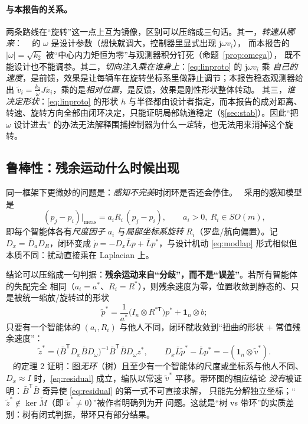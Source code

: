 \documentclass[11pt,a4paper]{ctexart}
\theoremstyle{plain}
\theoremstyle{definition}
\theoremstyle{remark}
\newcommand{\txi}{\tilde{x}}
\newcommand{\tv}{\tilde{v}}
\newcommand{\abs}[1]{\left|#1\right|}
\begin{document}
\paragraph{与本报告的关系。}
两条路线在“旋转”这一点上互为镜像，区别可以压缩成三句话。其一，\emph{转速从哪来}：
~\cite{lin2010} 的 $\omega$ 是设计参数（想快就调大，控制器里显式出现 $\mathrm j\omega v_i$），
而本报告的 $\abs{\omega}=\sqrt{k_2}$ 被“中心内力矩恒为零”与观测器积分钉死（命题~\ref{prop:omega}），
既不能设计也不能调参。其二，\emph{切向注入乘在谁身上}：\eqref{eq:linproto} 的 $\mathrm j\omega v_i$ 乘
\emph{自己的速度}，是前馈，效果是让每辆车在旋转坐标系里做静止调节；本报告稳态观测器给出
$\tv_i=\frac{k_2}{\omega}J\txi_i$，乘的是\emph{相对位置}，是反馈，效果是刚性形状整体转动。
其三，\emph{谁决定形状}：\eqref{eq:linproto} 的形状 $h$ 与半径都由设计者指定，而本报告的成对距离、
转速、旋转方向全部由闭环决定，只能证明局部轨道稳定（\S\ref{sec:stab}）。因此“把 $\omega$ 设计进去”
的办法无法解释围捕控制器为什么\emph{一定}转，也无法用来消掉这个旋转。

\subsection{鲁棒性：残余运动什么时候出现}
\label{sec:meth_robust}

同一框架下更微妙的问题是：\emph{感知不完美}时闭环是否还会停住。~\cite{tac2021} 采用的感知模型是
\begin{equation}
  (p_j-p_i)\big|_{\text{meas}}=a_iR_i\,(p_j-p_i),\qquad a_i>0,\ R_i\in SO(m),
  \label{eq:badsense}
\end{equation}
即每个智能体各有\emph{尺度因子} $a_i$ 与\emph{局部坐标系旋转} $R_i$（罗盘/航向偏置）。记
$D_x=\bar D_aD_R$，闭环变成 $\dot p=-D_x\bar Lp+\bar Lp^*$，与设计机动 \eqref{eq:modlap}
形式相似但本质不同：扰动直接乘在 Laplacian 上。

结论可以压缩成一句判据：\textbf{残余运动来自“分歧”，而不是“误差”}。若所有智能体的失配完全
相同（$a_i=a^*$、$R_i=R^*$），则残余速度为零，位置收敛到静态的、只是被统一缩放/旋转过的形状
\begin{equation}
  \tilde p^*=\frac{1}{a^*}\bigl(I_n\otimes R^{*\mathsf T}\bigr)p^*+\mathbf 1_n\otimes b ;
  \label{eq:trivial}
\end{equation}
只要有一个智能体的 $(a_i,R_i)$ 与他人不同，闭环就收敛到“扭曲的形状 + 常值残余速度”：
\begin{equation}
  \tilde z^*=\bigl(\bar B^{\mathsf T}D_x\bar B D_\omega\bigr)^{-1}\bar B^{\mathsf T}\bar BD_\omega z^*,
  \qquad
  D_x\bar L\tilde p^*-\bar Lp^*=-(\mathbf 1_n\otimes\tilde v^*).
  \label{eq:residual}
\end{equation}
~\cite{tac2021} 的定理 2 证明：图\emph{无环}（树）且至少有一个智能体的尺度或坐标系与他人不同、
$D_x\approx I$ 时，\eqref{eq:residual} 成立，编队以常速 $\tilde v^*$ 平移。带环图的相应结论
\emph{没有}被证明：$\bar B^{\mathsf T}\bar B$ 奇异使 \eqref{eq:residual} 的第一式不可直接求解，
只能先分解独立坐标；“$\tilde z^*\notin\ker\check M$（即 $\tilde v^*\neq0$）”被作者明确列为开
问题。这就是“树 vs 带环”的实质差别：树有闭式判据，带环只有部分结果。
\end{document}
